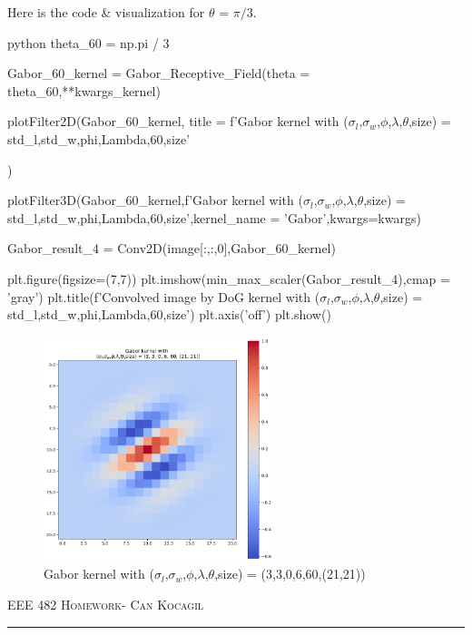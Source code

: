 \documentclass[12pt]{amsart}
\begin{document}
Here is the code \& visualization for $\theta$ = $\pi/3$.
\begin{mintedbox}{python}
theta_60 = np.pi / 3

Gabor_60_kernel = Gabor_Receptive_Field(theta = theta_60,**kwargs_kernel)

plotFilter2D(Gabor_60_kernel,
title = f'Gabor kernel with \n ($\sigma_l$,$\sigma_w$,$\phi$,$\lambda$,$\theta$,size) = {std_l,std_w,phi,Lambda,60,size}'

)

plotFilter3D(Gabor_60_kernel,f'Gabor kernel with \n ($\sigma_l$,$\sigma_w$,$\phi$,$\lambda$,$\theta$,size) = {std_l,std_w,phi,Lambda,60,size}',kernel_name = 'Gabor',kwargs=kwargs)



Gabor_result_4 = Conv2D(image[:,:,0],Gabor_60_kernel)


plt.figure(figsize=(7,7))
plt.imshow(min_max_scaler(Gabor_result_4),cmap = 'gray')
plt.title(f'Convolved image by DoG kernel with  \n ($\sigma_l$,$\sigma_w$,$\phi$,$\lambda$,$\theta$,size) = {std_l,std_w,phi,Lambda,60,size}')
plt.axis('off')
plt.show()


\end{mintedbox}

\begin{figure}[ht]
    \centering
    \includegraphics[width = 0.6\textwidth]{images/Gabor_60_2d.png}
    \caption{Gabor kernel with ($\sigma_l$,$\sigma_w$,$\phi$,$\lambda$,$\theta$,size) = (3,3,0,6,60,(21,21))}
\end{figure}

\newpage
{\scshape EEE 482} \hfill {\scshape \large  Homework-\relax} \hfill {\scshape Can Kocagil}
\smallskip
\hrule
\vspace{2mm}
\end{document}
